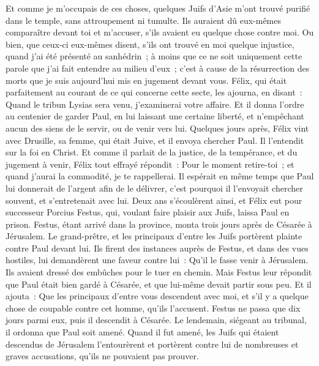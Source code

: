 \begin{multicols}{2}
Et comme je m'occupais de ces choses, quelques Juifs d'Asie m'ont trouvé purifié dans le temple, sans attroupement ni tumulte.
Ils auraient dû eux-mêmes comparaître devant toi et m'accuser, s'ils avaient eu quelque chose contre moi.
Ou bien, que ceux-ci eux-mêmes disent, s'ils ont trouvé en moi quelque injustice, quand j'ai été présenté au sanhédrin~;
à moins que ce ne soit uniquement cette parole que j'ai fait entendre au milieu d'eux~; c'est à cause de la résurrection des morts que je suis aujourd'hui mis en jugement devant vous.
Félix, qui était parfaitement au courant de ce qui concerne cette secte, les ajourna, en disant~: Quand le tribun Lysias sera venu, j'examinerai votre affaire.
Et il donna l'ordre au centenier de garder Paul, en lui laissant une certaine liberté, et n'empêchant aucun des siens de le servir, ou de venir vers lui.
Quelques jours après, Félix vint avec Drusille, sa femme, qui était Juive, et il envoya chercher Paul. Il l'entendit sur la foi en Christ.
Et comme il parlait de la justice, de la tempérance, et du jugement à venir, Félix tout effrayé répondit~: Pour le moment retire-toi~; et quand j'aurai la commodité, je te rappellerai.
Il espérait en même temps que Paul lui donnerait de l'argent afin de le délivrer, c'est pourquoi il l'envoyait chercher souvent, et s'entretenait avec lui.
Deux ans s'écoulèrent ainsi, et Félix eut pour successeur Porcius Festus, qui, voulant faire plaisir aux Juifs, laissa Paul en prison.
\VerseOne{}Festus, étant arrivé dans la province, monta trois jours après de Césarée à Jérusalem.
Le grand-prêtre, et les principaux d'entre les Juifs portèrent plainte contre Paul devant lui. Ils firent des instances auprès de Festus, et dans des vues hostiles,
lui demandèrent une faveur contre lui~: Qu'il le fasse venir à Jérusalem. Ils avaient dressé des embûches pour le tuer en chemin.
Mais Festus leur répondit que Paul était bien gardé à Césarée, et que lui-même devait partir sous peu.
Et il ajouta~: Que les principaux d'entre vous descendent avec moi, et s'il y a quelque chose de coupable contre cet homme, qu'ils l'accusent.
Festus ne passa que dix jours parmi eux, puis il descendit à Césarée. Le lendemain, siégeant au tribunal, il ordonna que Paul soit amené.
Quand il fut amené, les Juifs qui étaient descendus de Jérusalem l'entourèrent et portèrent contre lui de nombreuses et graves accusations, qu'ils ne pouvaient pas prouver.

\end{multicols}
